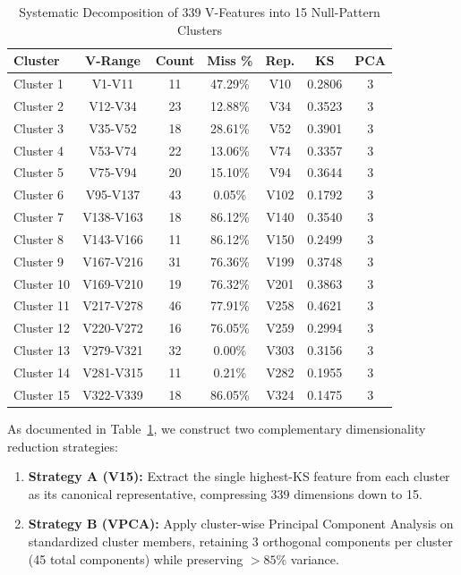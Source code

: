 \documentclass[conference]{IEEEtran}
\begin{document}
\begin{table}[htbp]
\caption{Systematic Decomposition of 339 V-Features into 15 Null-Pattern Clusters}
\label{tab:v_clusters}
\centering
\begin{tabular}{lcccccc}
\toprule
\textbf{Cluster} & \textbf{V-Range} & \textbf{Count} & \textbf{Miss \%} & \textbf{Rep.} & \textbf{KS} & \textbf{PCA} \\
\midrule
Cluster 1  & V1-V11   & 11 & 47.29\% & V10  & 0.2806 & 3 \\
Cluster 2  & V12-V34  & 23 & 12.88\% & V34  & 0.3523 & 3 \\
Cluster 3  & V35-V52  & 18 & 28.61\% & V52  & 0.3901 & 3 \\
Cluster 4  & V53-V74  & 22 & 13.06\% & V74  & 0.3357 & 3 \\
Cluster 5  & V75-V94  & 20 & 15.10\% & V94  & 0.3644 & 3 \\
Cluster 6  & V95-V137 & 43 & 0.05\%  & V102 & 0.1792 & 3 \\
Cluster 7  & V138-V163& 18 & 86.12\% & V140 & 0.3540 & 3 \\
Cluster 8  & V143-V166& 11 & 86.12\% & V150 & 0.2499 & 3 \\
Cluster 9  & V167-V216& 31 & 76.36\% & V199 & 0.3748 & 3 \\
Cluster 10 & V169-V210& 19 & 76.32\% & V201 & 0.3863 & 3 \\
Cluster 11 & V217-V278& 46 & 77.91\% & V258 & 0.4621 & 3 \\
Cluster 12 & V220-V272& 16 & 76.05\% & V259 & 0.2994 & 3 \\
Cluster 13 & V279-V321& 32 & 0.00\%  & V303 & 0.3156 & 3 \\
Cluster 14 & V281-V315& 11 & 0.21\%  & V282 & 0.1955 & 3 \\
Cluster 15 & V322-V339& 18 & 86.05\% & V324 & 0.1475 & 3 \\
\bottomrule
\end{tabular}
\end{table}

As documented in Table~\ref{tab:v_clusters}, we construct two complementary dimensionality reduction strategies:
\begin{enumerate}
    \item \textbf{Strategy A (V15):} Extract the single highest-KS feature from each cluster as its canonical representative, compressing 339 dimensions down to 15.
    \item \textbf{Strategy B (VPCA):} Apply cluster-wise Principal Component Analysis on standardized cluster members, retaining 3 orthogonal components per cluster (45 total components) while preserving $>85\%$ variance.
\end{enumerate}
\end{document}
